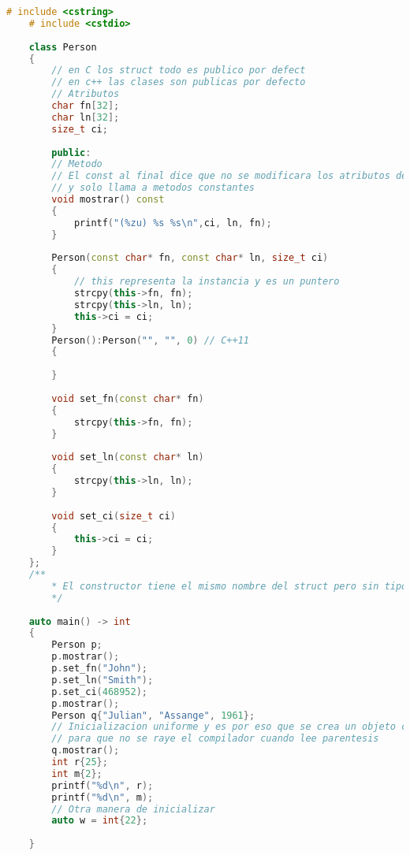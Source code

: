 \begin{lstlisting}[language=C++, caption={class}]
    # include <cstring>
    # include <cstdio>
    
    class Person
    {
        // en C los struct todo es publico por defect
        // en c++ las clases son publicas por defecto
        // Atributos
        char fn[32];
        char ln[32];
        size_t ci;
        
        public:
        // Metodo
        // El const al final dice que no se modificara los atributos de la clase
        // y solo llama a metodos constantes 
        void mostrar() const
        {
            printf("(%zu) %s %s\n",ci, ln, fn);
        }
    
        Person(const char* fn, const char* ln, size_t ci)
        {
            // this representa la instancia y es un puntero
            strcpy(this->fn, fn);
            strcpy(this->ln, ln);
            this->ci = ci;
        }
        Person():Person("", "", 0) // C++11
        {
            
        }
    
        void set_fn(const char* fn)
        {
            strcpy(this->fn, fn);
        }
    
        void set_ln(const char* ln)
        {
            strcpy(this->ln, ln);
        }
    
        void set_ci(size_t ci)
        {
            this->ci = ci;
        }
    };
    /**
        * El constructor tiene el mismo nombre del struct pero sin tipo de retorno
        */
    
    auto main() -> int
    {
        Person p;
        p.mostrar();
        p.set_fn("John");
        p.set_ln("Smith");
        p.set_ci(468952);
        p.mostrar();
        Person q{"Julian", "Assange", 1961};
        // Inicializacion uniforme y es por eso que se crea un objeto con llaves {}
        // para que no se raye el compilador cuando lee parentesis
        q.mostrar();
        int r{25};
        int m{2};
        printf("%d\n", r);
        printf("%d\n", m);
        // Otra manera de inicializar
        auto w = int{22};
    
    }
\end{lstlisting}